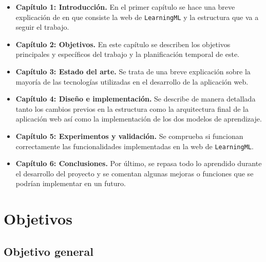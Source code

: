 \documentclass[a4paper, 12pt]{book}
\begin{document}
\begin{itemize}
  \item \textbf{Capítulo 1: Introducción.} En el primer capítulo se hace una breve explicación de en que consiste la web de \texttt{LearningML} y la estructura que va a seguir el trabajo.
  
  \item \textbf{Capítulo 2: Objetivos.} En este capítulo se describen los objetivos principales y específicos del trabajo y la planificación temporal de este.
  
  \item \textbf{Capítulo 3: Estado del arte.} Se trata de una breve explicación sobre la mayoría de las tecnologías utilizadas en el desarrollo de la aplicación web.

  \item \textbf{Capítulo 4: Diseño e implementación.} Se describe de manera detallada tanto los cambios previos en la estructura como la arquitectura final de la aplicación web así como la implementación de los dos modelos de aprendizaje.
  
  \item \textbf{Capítulo 5: Experimentos y validación.} Se comprueba si funcionan correctamente las funcionalidades implementadas en la web de \texttt{LearningML}.
  
  \item \textbf{Capítulo 6: Conclusiones.} Por último, se repasa todo lo aprendido durante el desarrollo del proyecto y se comentan algunas mejoras o funciones que se podrían implementar en un futuro.
 
\end{itemize}




\cleardoublepage %
\chapter{Objetivos} %
\label{chap:objetivos} %

\section{Objetivo general} %
\label{sec:objetivo-general} %
\end{document}
